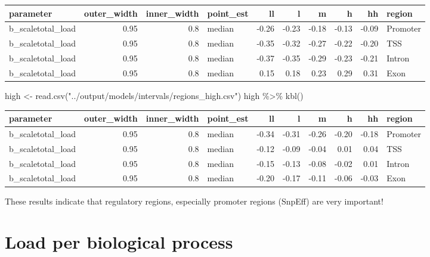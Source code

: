 \documentclass[
  letterpaper,
  DIV=11,
  numbers=noendperiod]{scrreprt}
\newenvironment{Shaded}{}{}
\newcommand{\FunctionTok}[1]{\textcolor[rgb]{0.44,0.26,0.76}{#1}}
\newcommand{\NormalTok}[1]{\textcolor[rgb]{0.14,0.16,0.18}{#1}}
\newcommand{\OtherTok}[1]{\textcolor[rgb]{0.44,0.26,0.76}{#1}}
\newcommand{\SpecialCharTok}[1]{\textcolor[rgb]{0.00,0.36,0.77}{#1}}
\newcommand{\StringTok}[1]{\textcolor[rgb]{0.01,0.18,0.38}{#1}}
\begin{document}
\begin{tabular}[t]{l|r|r|l|r|r|r|r|r|l}
\hline
parameter & outer\_width & inner\_width & point\_est & ll & l & m & h & hh & region\\
\hline
b\_scaletotal\_load & 0.95 & 0.8 & median & -0.26 & -0.23 & -0.18 & -0.13 & -0.09 & Promoter\\
\hline
b\_scaletotal\_load & 0.95 & 0.8 & median & -0.35 & -0.32 & -0.27 & -0.22 & -0.20 & TSS\\
\hline
b\_scaletotal\_load & 0.95 & 0.8 & median & -0.37 & -0.35 & -0.29 & -0.23 & -0.21 & Intron\\
\hline
b\_scaletotal\_load & 0.95 & 0.8 & median & 0.15 & 0.18 & 0.23 & 0.29 & 0.31 & Exon\\
\hline
\end{tabular}

\begin{Shaded}
\begin{Highlighting}[]
\NormalTok{high }\OtherTok{\textless{}{-}} \FunctionTok{read.csv}\NormalTok{(}\StringTok{"../output/models/intervals/regions\_high.csv"}\NormalTok{)}
\NormalTok{high }\SpecialCharTok{\%\textgreater{}\%} \FunctionTok{kbl}\NormalTok{()}
\end{Highlighting}
\end{Shaded}

\begin{tabular}[t]{l|r|r|l|r|r|r|r|r|l}
\hline
parameter & outer\_width & inner\_width & point\_est & ll & l & m & h & hh & region\\
\hline
b\_scaletotal\_load & 0.95 & 0.8 & median & -0.34 & -0.31 & -0.26 & -0.20 & -0.18 & Promoter\\
\hline
b\_scaletotal\_load & 0.95 & 0.8 & median & -0.12 & -0.09 & -0.04 & 0.01 & 0.04 & TSS\\
\hline
b\_scaletotal\_load & 0.95 & 0.8 & median & -0.15 & -0.13 & -0.08 & -0.02 & 0.01 & Intron\\
\hline
b\_scaletotal\_load & 0.95 & 0.8 & median & -0.20 & -0.17 & -0.11 & -0.06 & -0.03 & Exon\\
\hline
\end{tabular}

These results indicate that regulatory regions, especially promoter
regions (SnpEff) are very important!


\chapter{Load per biological process}\label{load-per-biological-process}
\end{document}
